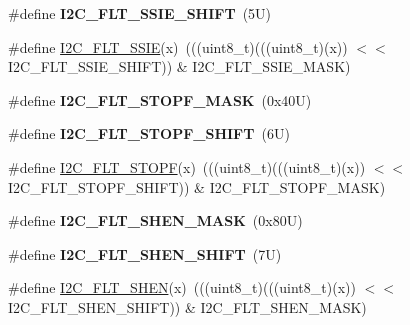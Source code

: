 \begin{DoxyCompactItemize}
\#define {\bfseries I2\+C\+\_\+\+F\+L\+T\+\_\+\+S\+S\+I\+E\+\_\+\+S\+H\+I\+FT}~(5\+U)
\item 
\#define \mbox{\hyperlink{group___i2_c___register___masks_ga1002a3d1769dd5ddacefa1140f8003c0}{I2\+C\+\_\+\+F\+L\+T\+\_\+\+S\+S\+IE}}(x)~(((uint8\+\_\+t)(((uint8\+\_\+t)(x)) $<$$<$ I2\+C\+\_\+\+F\+L\+T\+\_\+\+S\+S\+I\+E\+\_\+\+S\+H\+I\+FT)) \& I2\+C\+\_\+\+F\+L\+T\+\_\+\+S\+S\+I\+E\+\_\+\+M\+A\+SK)
\item 
\mbox{\label{group___i2_c___register___masks_ga49bb44800a0defc2dd1efb27263f7c52}} 
\#define {\bfseries I2\+C\+\_\+\+F\+L\+T\+\_\+\+S\+T\+O\+P\+F\+\_\+\+M\+A\+SK}~(0x40\+U)
\item 
\mbox{\label{group___i2_c___register___masks_gae69dbb7d8bd1dff50e5c30846d3285bb}} 
\#define {\bfseries I2\+C\+\_\+\+F\+L\+T\+\_\+\+S\+T\+O\+P\+F\+\_\+\+S\+H\+I\+FT}~(6\+U)
\item 
\#define \mbox{\hyperlink{group___i2_c___register___masks_gaa7638f8d630f1911fcf5d5d3441ea4fb}{I2\+C\+\_\+\+F\+L\+T\+\_\+\+S\+T\+O\+PF}}(x)~(((uint8\+\_\+t)(((uint8\+\_\+t)(x)) $<$$<$ I2\+C\+\_\+\+F\+L\+T\+\_\+\+S\+T\+O\+P\+F\+\_\+\+S\+H\+I\+FT)) \& I2\+C\+\_\+\+F\+L\+T\+\_\+\+S\+T\+O\+P\+F\+\_\+\+M\+A\+SK)
\item 
\mbox{\label{group___i2_c___register___masks_gac404fda03fc23c08a56018d6ab2fc977}} 
\#define {\bfseries I2\+C\+\_\+\+F\+L\+T\+\_\+\+S\+H\+E\+N\+\_\+\+M\+A\+SK}~(0x80\+U)
\item 
\mbox{\label{group___i2_c___register___masks_ga5d6c7b67f99e1f592d199bb77f7d5605}} 
\#define {\bfseries I2\+C\+\_\+\+F\+L\+T\+\_\+\+S\+H\+E\+N\+\_\+\+S\+H\+I\+FT}~(7\+U)
\item 
\#define \mbox{\hyperlink{group___i2_c___register___masks_ga8b71d53a5730c117133239d8245be98f}{I2\+C\+\_\+\+F\+L\+T\+\_\+\+S\+H\+EN}}(x)~(((uint8\+\_\+t)(((uint8\+\_\+t)(x)) $<$$<$ I2\+C\+\_\+\+F\+L\+T\+\_\+\+S\+H\+E\+N\+\_\+\+S\+H\+I\+FT)) \& I2\+C\+\_\+\+F\+L\+T\+\_\+\+S\+H\+E\+N\+\_\+\+M\+A\+SK)
\end{DoxyCompactItemize}
